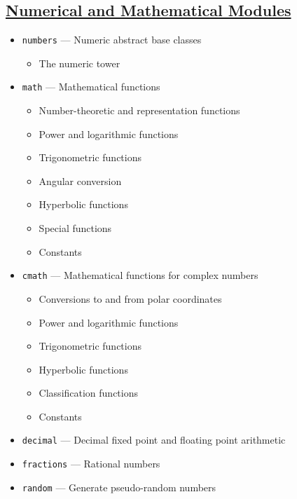 \documentclass[]{book}
\providecommand{\tightlist}{%
  \setlength{\itemsep}{0pt}\setlength{\parskip}{0pt}}
\theoremstyle{definition}
\theoremstyle{definition}
\theoremstyle{definition}
\theoremstyle{remark}
\begin{document}
\subsection{\texorpdfstring{\href{https://docs.python.org/3.7/library/numeric.html}{Numerical
and Mathematical
Modules}}{Numerical and Mathematical Modules}}\label{numerical-and-mathematical-modules}

\begin{itemize}
\tightlist
\item
  \texttt{numbers} --- Numeric abstract base classes

  \begin{itemize}
  \tightlist
  \item
    The numeric tower
  \end{itemize}
\item
  \texttt{math} --- Mathematical functions

  \begin{itemize}
  \tightlist
  \item
    Number-theoretic and representation functions
  \item
    Power and logarithmic functions
  \item
    Trigonometric functions
  \item
    Angular conversion
  \item
    Hyperbolic functions
  \item
    Special functions
  \item
    Constants
  \end{itemize}
\item
  \texttt{cmath} --- Mathematical functions for complex numbers

  \begin{itemize}
  \tightlist
  \item
    Conversions to and from polar coordinates
  \item
    Power and logarithmic functions
  \item
    Trigonometric functions
  \item
    Hyperbolic functions
  \item
    Classification functions
  \item
    Constants
  \end{itemize}
\item
  \texttt{decimal} --- Decimal fixed point and floating point arithmetic
\item
  \texttt{fractions} --- Rational numbers
\item
  \texttt{random} --- Generate pseudo-random numbers


\end{itemize}
\end{document}

